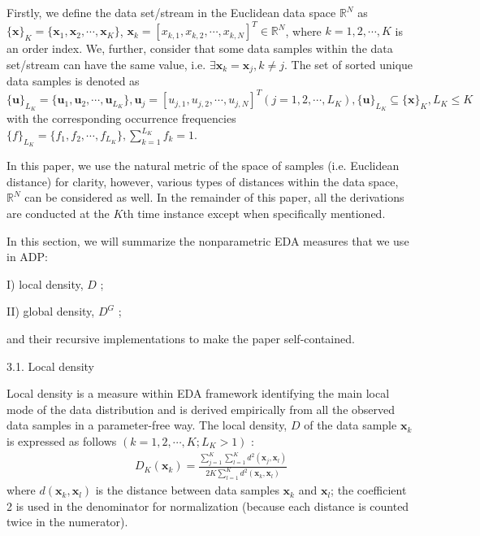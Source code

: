 {Firstly, we define the data set/stream in the Euclidean data space $\mathbb R^N$ as $\{\bm x\}_K = \{\bm x_1, \bm x_2, \cdots, \bm x_K\}$, $\bm x_k =[x_{k, 1}, x_{k, 2}, \cdots, x_{k, N}]^T \in \mathbb R^N$, where $k = 1, 2, \cdots, K$ is an order index. We, further, consider that some data samples within the data set/stream can have the same value, i.e. $\exists \bm x_k = \bm x_j, k\neq j$. The set of sorted unique data samples is denoted as $\{\bm u\}_{L_K} =\{\bm u_1, \bm u_2, \cdots, \bm u_{L_K}\},\bm u_j = [u_{j,1}, u_{j,2}, \cdots, u_{j,N}]^T ( j = 1, 2, \cdots, L_K), \{\bm u\}_{L_K} \subseteq \{\bm x\}_K , L_K \leq K$ with the corresponding occurrence frequencies
$\{f\}_{L_K} = \{ f_1, f_2, \cdots, f_{L_K}\},\sum\limits^{L_K}_{k=1} f_k = 1$.

In this paper, we use the natural metric of the space of samples (i.e. Euclidean distance) for clarity, however, various types of distances within the data space, $\mathbb R^N$ can be considered as well. In the remainder of this paper, all the derivations are conducted at the $K$th time instance except when specifically mentioned.

In this section, we will summarize the nonparametric EDA measures that we use in ADP:

I) local density, $D$ \cite{Angelov2016-7844219,Angelov2017Empirical};

II) global density, $D^G$ \cite{Angelov2016-7844219,Angelov2017Empirical};

and their recursive implementations to make the paper self-contained.


3.1. Local density

Local density \cite{Angelov2016-7844219} is a measure within EDA framework identifying the main local mode of the data distribution and is derived empirically from all the observed data samples in a parameter-free way. The local density, $D$ of the data sample $\bm x_k$ is expressed as follows $(k = 1, 2, \cdots, K; L_K > 1)$ \cite{Angelov2016-7844219,Angelov2017Empirical}:
\begin{align}\label{EDAlocaldensity18072401}
    D_K(\bm x_k) =\frac{\sum^K_{j=1}\sum^K_{l=1} d^2(\bm x_j,\bm  x_l)} {2K \sum^K_{l=1} d^2(\bm x_k,\bm  x_l)}
\end{align}
where $d(\bm x_k, \bm x_l)$ is the distance between data samples $\bm x_k$ and $\bm x_l$; the coefficient 2 is used in the denominator for normalization (because each distance is counted twice in the numerator).

}
